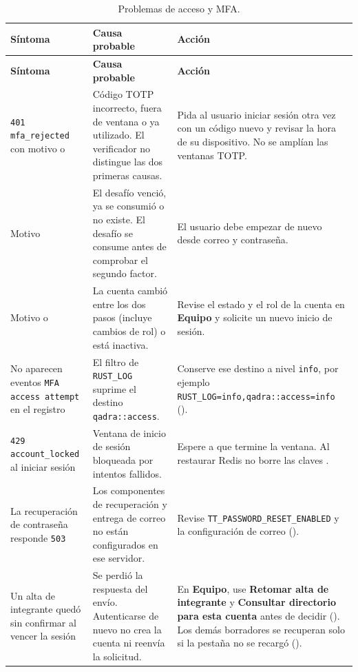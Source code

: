 {\small
\begin{longtable}{L{3.7cm} L{4.6cm} L{7.1cm}}
  \caption{Problemas de acceso y MFA.}\label{tab:prob-acceso} \\
  \toprule
  \textbf{Síntoma} & \textbf{Causa probable} & \textbf{Acción} \\
  \midrule
  \endfirsthead
  \toprule
  \textbf{Síntoma} & \textbf{Causa probable} & \textbf{Acción} \\
  \midrule
  \endhead
  \bottomrule
  \endfoot
    \texttt{401 mfa\_rejected} con motivo
       o
      & Código TOTP incorrecto, fuera de ventana o ya utilizado. El
        verificador no distingue las dos primeras causas.
      & Pida al usuario iniciar sesión otra vez con un código nuevo y revisar
        la hora de su dispositivo. No se amplían las ventanas TOTP. \\
    Motivo 
      & El desafío venció, ya se consumió o no existe. El desafío se consume
        antes de comprobar el segundo factor.
      & El usuario debe empezar de nuevo desde correo y contraseña. \\
    Motivo  o 
      & La cuenta cambió entre los dos pasos (incluye cambios de rol) o está
        inactiva.
      & Revise el estado y el rol de la cuenta en \textbf{Equipo} y solicite
        un nuevo inicio de sesión. \\
    No aparecen eventos \texttt{MFA access attempt} en el registro
      & El filtro de \texttt{RUST\_LOG} suprime el destino
        \texttt{qadra::access}.
      & Conserve ese destino a nivel \texttt{info}, por ejemplo
        \texttt{RUST\_LOG=info,qadra::access=info}
        (). \\
    \texttt{429 account\_locked} al iniciar sesión
      & Ventana de inicio de sesión bloqueada por intentos fallidos.
      & Espere a que termine la ventana. Al restaurar Redis no borre las
        claves . \\
    La recuperación de contraseña responde \texttt{503}
      & Los componentes de recuperación y entrega de correo no están
        configurados en ese servidor.
      & Revise \texttt{TT\_PASSWORD\_RESET\_ENABLED} y la configuración de
        correo (). \\
    Un alta de integrante quedó sin confirmar al vencer la sesión
      & Se perdió la respuesta del envío. Autenticarse de nuevo no crea la
        cuenta ni reenvía la solicitud.
      & En \textbf{Equipo}, use \textbf{Retomar alta de integrante} y
        \textbf{Consultar directorio para esta cuenta} antes de decidir
        (). Los demás
        borradores se recuperan solo si la pestaña no se recargó
        (). \\
\end{longtable}}

